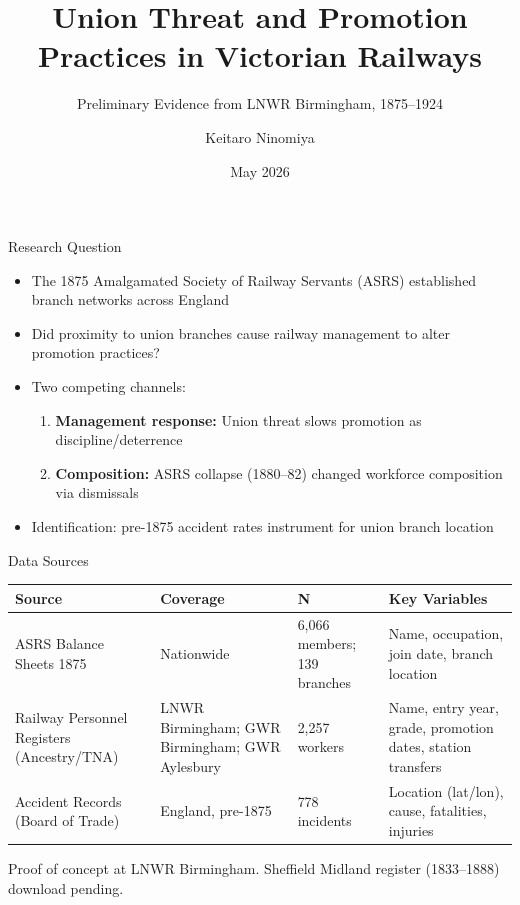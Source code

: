 \documentclass[10pt,aspectratio=169]{beamer}
\title{Union Threat and Promotion Practices in Victorian Railways}
\subtitle{Preliminary Evidence from LNWR Birmingham, 1875--1924}
\author{Keitaro Ninomiya}
\institute{University of Illinois at Urbana-Champaign}
\date{May 2026}
\begin{document}
\begin{frame}{Research Question}
\begin{itemize}
  \item The 1875 Amalgamated Society of Railway Servants (ASRS) established branch networks across England
  \item Did proximity to union branches cause railway management to alter promotion practices?
  \item Two competing channels:
    \begin{enumerate}
      \item \textbf{Management response:} Union threat slows promotion as discipline/deterrence
      \item \textbf{Composition:} ASRS collapse (1880--82) changed workforce composition via dismissals
    \end{enumerate}
  \item Identification: pre-1875 accident rates instrument for union branch location
\end{itemize}
\end{frame}

\begin{frame}{Data Sources}
\small
\begin{tabular}{p{}p{}p{}p{}}
\toprule
\textbf{Source} & \textbf{Coverage} & \textbf{N} & \textbf{Key Variables} \\
\midrule
ASRS Balance Sheets 1875 & Nationwide & 6,066 members; 139 branches & Name, occupation, join date, branch location \\
\addlinespace
Railway Personnel Registers (Ancestry/TNA) & LNWR Birmingham; GWR Birmingham; GWR Aylesbury & 2,257 workers & Name, entry year, grade, promotion dates, station transfers \\
\addlinespace
Accident Records (Board of Trade) & England, pre-1875 & 778 incidents & Location (lat/lon), cause, fatalities, injuries \\
\bottomrule
\end{tabular}

\vfill
\footnotesize Proof of concept at LNWR Birmingham. Sheffield Midland register (1833--1888) download pending.
\end{frame}
\end{document}
